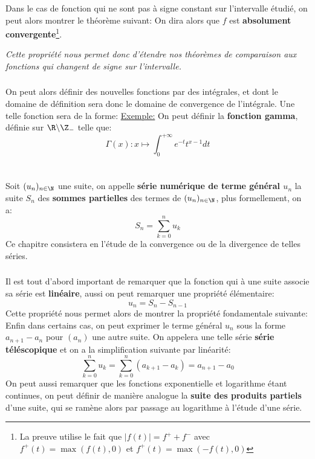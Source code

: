 \subsection*{}
Dans le cas de fonction qui ne sont pas à signe constant sur l'intervalle étudié, on peut alors montrer le théorème suivant:
On dira alors que \(f\) est \textbf{absolument convergente}\footnote[4]{La preuve utilise le fait que \(|f(t)| = f^+ + f^-\) avec \(f^+(t) = \max(f(t), 0)\) et \(f^+(t) = \max(-f(t), 0)\)}.
\begin{center}
   \textit{Cette propriété nous permet donc d'étendre nos théorèmes de comparaison aux fonctions qui changent de signe sur l'intervalle.}
\end{center}
\subsection*{}
On peut alors définir des nouvelles fonctions par des intégrales, et dont le domaine de définition sera donc le domaine de convergence de l'intégrale. Une telle fonction sera de la forme:
\underline{Exemple:} On peut définir la \textbf{fonction gamma}, définie sur \(\R \backslash \Z_-\) telle que:
\[
   \Gamma(x): x \mapsto \int_{0}^{+\infty} e^{-t}t^{x-1} d t   
\]
\chapter*{}
Soit \((u_n)_{n\in\N}\) une suite, on appelle \textbf{série numérique de terme général \(u_n\)} la suite \(S_n\) des \textbf{sommes partielles} des termes de \((u_n)_{n\in\N}\), plus formellement, on a:
\[
   S_n = \sum_{k=0}^{n} u_k   
\]
Ce chapitre consistera en l'étude de la convergence ou de la divergence de telles séries. 
\subsection*{}
Il est tout d'abord important de remarquer que la fonction qui à une suite associe sa série est \textbf{linéaire}, aussi on peut remarquer une propriété élémentaire:
\[
   u_n = S_{n} - S_{n-1}   
\]
Cette propriété nous permet alors de montrer la propriété fondamentale suivante:
Enfin dans certains cas, on peut exprimer le terme général \(u_n\) sous la forme \(a_{n+1} - a_n\) pour \((a_n)\) une autre suite. On appelera une telle série \textbf{série téléscopique} et on a la simplification suivante par linéarité:
\[
   \sum_{k=0}^{n} u_k = \sum_{k=0}^{n} (a_{k+1} - a_k) = a_{n+1} - a_0   
\]
On peut aussi remarquer que les fonctions exponentielle et logarithme étant continues, on peut définir de manière analogue la \textbf{suite des produits partiels} d'une suite, qui se ramène alors par passage au logarithme à l'étude d'une série.
